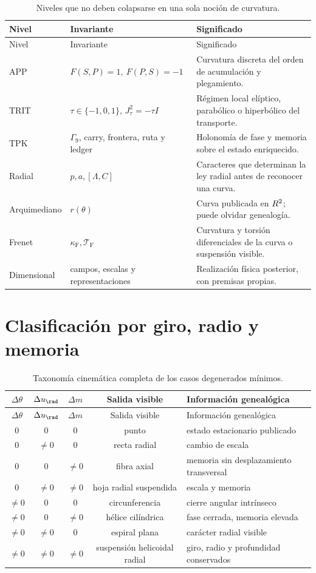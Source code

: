 \begin{longtable}{p{}p{}p{}}
\caption{Niveles que no deben colapsarse en una sola noción de curvatura.}
\label{espiral:tab:niveles-curvatura}\\
\toprule
Nivel&Invariante&Significado\\
\midrule
\endfirsthead
\toprule
Nivel&Invariante&Significado\\
\midrule
\endhead
APP&\(F(S,P)=1,\ F(P,S)=-1\)&Curvatura discreta del orden de acumulación
y plegamiento.\\
TRIT&\(\tau\in\{-1,0,1\}\), \(J_\tau^2=-\tau I\)&Régimen local elíptico,
parabólico o hiperbólico del transporte.\\
TPK&\(\Gamma_9\), carry, frontera, ruta y ledger&Holonomía de fase y
memoria sobre el estado enriquecido.\\
Radial&\(p,a,[\Lambda,C]\)&Caracteres que determinan la ley
radial antes de reconocer una curva.\\
Arquimediano&\(r(\theta)\)&Curva publicada en \(R^2\); puede olvidar
genealogía.\\
Frenet&\(\kappa_{\mathrm{F}},\mathcal T_{\mathrm{F}}\)&Curvatura y torsión
diferenciales de la curva o suspensión visible.\\
Dimensional&campos, escalas y representaciones&Realización física posterior,
con premisas propias.\\
\bottomrule
\end{longtable}

\section{Clasificación por giro, radio y memoria}

\begin{longtable}{ccccl}
\caption{Taxonomía cinemática completa de los casos degenerados mínimos.}
\label{espiral:tab:taxonomia-cinematica-ap}\\
\toprule
\(\Delta\theta\)&\(\Delta u_{\rad}\)&\(\Delta m\)&Salida visible&
Información genealógica\\
\midrule
\endfirsthead
\toprule
\(\Delta\theta\)&\(\Delta u_{\rad}\)&\(\Delta m\)&Salida visible&
Información genealógica\\
\midrule
\endhead
\(0\)&\(0\)&\(0\)&punto&estado estacionario publicado\\
\(0\)&\(\neq0\)&\(0\)&recta radial&cambio de escala\\
\(0\)&\(0\)&\(\neq0\)&fibra axial&memoria sin desplazamiento transversal\\
\(0\)&\(\neq0\)&\(\neq0\)&hoja radial suspendida&escala y memoria\\
\(\neq0\)&\(0\)&\(0\)&circunferencia&cierre angular intrínseco\\
\(\neq0\)&\(0\)&\(\neq0\)&hélice cilíndrica&fase cerrada, memoria elevada\\
\(\neq0\)&\(\neq0\)&\(0\)&espiral plana&carácter radial visible\\
\(\neq0\)&\(\neq0\)&\(\neq0\)&suspensión helicoidal radial&giro, radio y
profundidad conservados\\
\bottomrule
\end{longtable}

